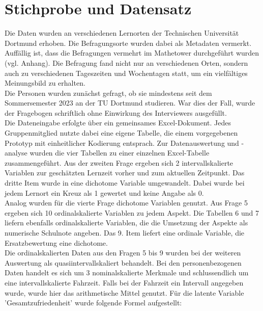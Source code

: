 \documentclass[11pt, a4paper]{article}
\begin{document}
\newpage
\section{Stichprobe und Datensatz}
\label{Stichprobe und Datensatz}

Die Daten wurden an verschiedenen Lernorten der Technischen Universität Dortmund erhoben. Die Befragungsorte wurden dabei als Metadaten vermerkt. Auffällig ist, dass die Befragungen vermehrt im Mathetower durchgeführt wurden (vgl. Anhang). Die Befragung fand nicht nur an verschiedenen Orten, sondern auch zu verschiedenen Tageszeiten und Wochentagen statt, um ein vielfältiges Meinungsbild zu erhalten.\\

Die Personen wurden zunächst gefragt, ob sie mindestens seit dem Sommersemester 2023 an der TU Dortmund studieren. War dies der Fall, wurde der Fragebogen schriftlich ohne Einwirkung des Interviewers ausgefüllt.\\

Die Dateneingabe erfolgte über ein gemeinsames Excel-Dokument. Jedes Gruppenmitglied nutzte dabei eine eigene Tabelle, die einem vorgegebenen Prototyp mit einheitlicher Kodierung entsprach. Zur Datenauswertung und -analyse wurden die vier Tabellen zu einer einzelnen Excel-Tabelle zusammengeführt. Aus der zweiten Frage ergeben sich 2 intervallskalierte Variablen zur geschätzten Lernzeit vorher und zum aktuellen Zeitpunkt. Das dritte Item wurde in eine dichotome Variable umgewandelt. Dabei wurde bei jedem Lernort ein Kreuz als 1 gewertet und keine Angabe als 0. \\

Analog wurden für die vierte Frage dichotome Variablen genutzt. Aus Frage 5 ergeben sich 10 ordinalskalierte Variablen zu jedem Aspekt. Die Tabellen 6 und 7 liefern ebenfalls ordinalskalierte Variablen, die die Umsetzung der Aspekte als numerische Schulnote angeben. Das 9. Item liefert eine ordinale Variable, die Ersatzbewertung eine dichotome.\\


Die ordinalskalierten Daten aus den Fragen 5 bis 9 wurden bei der weiteren Auswertung als quasiintervallskaliert behandelt. Bei den personenbezogenen Daten handelt es sich um 3 nominalskalierte Merkmale und schlussendlich um eine intervallskalierte Fahrzeit. Falls bei der Fahrzeit ein Intervall angegeben wurde, wurde hier das arithmetische Mittel genutzt. 
Für die latente Variable 'Gesamtzufriedenheit' wurde folgende Formel aufgestellt:
\end{document}
